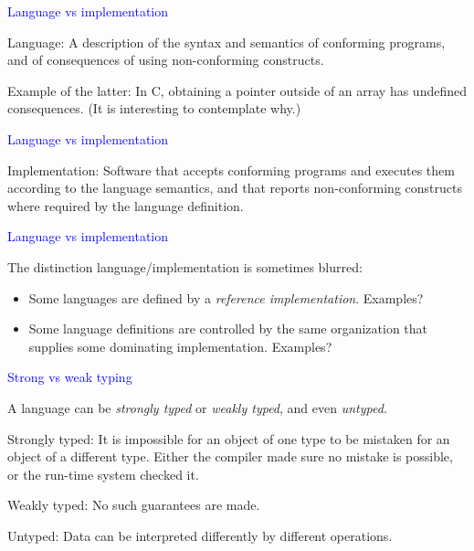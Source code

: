 \documentclass{slides}
\newcommand{\ti}[1]{\begin{center}\Large{\textcolor{blue}{#1}}\end{center}}
\begin{document}
\begin{slide}\ti{Language vs implementation}

Language: A description of the syntax and semantics of conforming
programs, and of consequences of using non-conforming constructs.

Example of the latter: In C, obtaining a pointer outside of an array
has undefined consequences.  (It is interesting to contemplate why.)

\vfill\end{slide}
\begin{slide}\ti{Language vs implementation}

Implementation: Software that accepts conforming programs and executes
them according to the language semantics, and that reports
non-conforming constructs where required by the language definition.

\vfill\end{slide}
\begin{slide}\ti{Language vs implementation}

The distinction language/implementation is sometimes blurred:

\begin{itemize}
\item Some languages are defined by a \emph{reference
  implementation}.  Examples?
\item Some language definitions are controlled by the same
  organization that supplies some dominating implementation.
  Examples?
\end{itemize}

\vfill\end{slide}
\begin{slide}\ti{Strong vs weak typing}

A language can be \emph{strongly typed} or \emph{weakly typed}, and
even \emph{untyped}.

Strongly typed: It is impossible for an object of one type to be
mistaken for an object of a different type.  Either the compiler made
sure no mistake is possible, or the run-time system checked it.

Weakly typed: No such guarantees are made.

Untyped: Data can be interpreted differently by different operations.

\vfill\end{slide}
\end{document}
